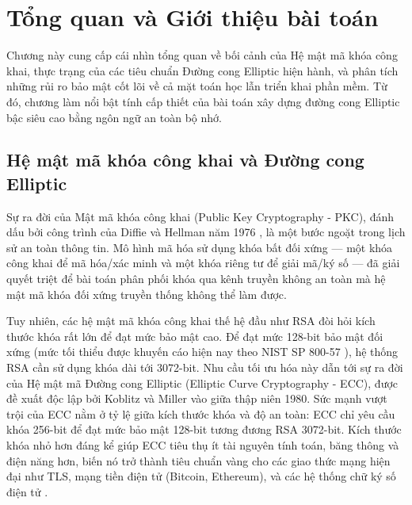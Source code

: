 
\clearpage
{}

\setcounter{chapter}{0}
\chapter[Tổng quan và Giới thiệu bài toán]{Tổng quan và Giới thiệu bài
toán}

Chương này cung cấp cái nhìn tổng quan về bối cảnh của Hệ mật mã khóa
công khai, thực trạng của các tiêu chuẩn Đường cong Elliptic hiện hành,
và phân tích những rủi ro bảo mật cốt lõi về cả mặt toán học lẫn triển
khai phần mềm. Từ đó, chương làm nổi bật tính cấp thiết của bài toán xây
dựng đường cong Elliptic bậc siêu cao bằng ngôn ngữ an toàn bộ nhớ.

\section{Hệ mật mã khóa công khai và Đường cong
Elliptic}\label{hux1ec7-mux1eadt-muxe3-khuxf3a-cuxf4ng-khai-vuxe0-ux111ux1b0ux1eddng-cong-elliptic}

Sự ra đời của Mật mã khóa công khai (Public Key Cryptography - PKC),
đánh dấu bởi công trình của Diffie và Hellman năm 1976
\citep{DiffieHellman1976}, là một bước ngoặt trong lịch sử an toàn thông
tin. Mô hình mã hóa sử dụng khóa bất đối xứng --- một khóa công khai để
mã hóa/xác minh và một khóa riêng tư để giải mã/ký số --- đã giải quyết
triệt để bài toán phân phối khóa qua kênh truyền không an toàn mà hệ mật
mã khóa đối xứng truyền thống không thể làm được.

Tuy nhiên, các hệ mật mã khóa công khai thế hệ đầu như RSA đòi hỏi kích
thước khóa rất lớn để đạt mức bảo mật cao. Để đạt mức 128-bit bảo mật
đối xứng (mức tối thiểu được khuyến cáo hiện nay theo NIST SP 800-57
\citep{NIST80057}), hệ thống RSA cần sử dụng khóa dài tới 3072-bit. Nhu
cầu tối ưu hóa này dẫn tới sự ra đời của Hệ mật mã Đường cong Elliptic
(Elliptic Curve Cryptography - ECC), được đề xuất độc lập bởi Koblitz
\citep{Koblitz1987} và Miller \citep{Miller1985} vào giữa thập niên
1980. Sức mạnh vượt trội của ECC nằm ở tỷ lệ giữa kích thước khóa và độ
an toàn: ECC chỉ yêu cầu khóa 256-bit để đạt mức bảo mật 128-bit tương
đương RSA 3072-bit. Kích thước khóa nhỏ hơn đáng kể giúp ECC tiêu thụ ít
tài nguyên tính toán, băng thông và điện năng hơn, biến nó trở thành
tiêu chuẩn vàng cho các giao thức mạng hiện đại như TLS, mạng tiền điện
tử (Bitcoin, Ethereum), và các hệ thống chữ ký số điện tử
\citep{Rosing2024}.

